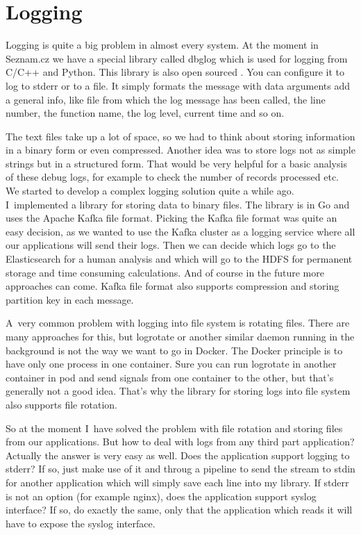 \chapter{Logging}

Logging is quite a big problem in almost every system. At the moment in Seznam.cz we have a special library called dbglog which is used for logging from C/C++ and Python. This library is also open sourced \cite{dbglog}. You can configure it to log to stderr or to a file. It simply formats the message with data arguments add a general info, like file from which the log message has been called, the line number, the function name, the log level, current time and so on.

The text files take up a lot of space, so we had to think about storing information in a binary form or even compressed. Another idea was to store logs not as simple strings but in a structured form. That would be very helpful for a basic analysis of these debug logs, for example to check the number of records processed etc. We started to develop a complex logging solution quite a while ago. I~implemented a library for storing data to binary files. The library is in Go and uses the Apache Kafka \cite{kafka} file format. Picking the Kafka file format was quite an easy decision, as we wanted to use the Kafka cluster as a logging service where all our applications will send their logs. Then we can decide which logs go to the Elasticsearch \cite{elasticsearch} for a human analysis and which will go to the HDFS \cite{hdfs} for permanent storage and time consuming calculations. And of course in the future more approaches can come. Kafka file format also supports compression and storing partition key in each message.

A~very common problem with logging into file system is rotating files. There are many approaches for this, but logrotate or another similar daemon running in the background is not the way we want to go in Docker. The Docker principle is to have only one process in one container. Sure you can run logrotate in another container in pod and send signals from one container to the other, but that’s generally not a good idea. That’s why the library for storing logs into file system also supports file rotation.

So at the moment I~have solved the problem with file rotation and storing files from our applications. But how to deal with logs from any third part application? Actually the answer is very easy as well. Does the application support logging to stderr? If so, just make use of it and throug a pipeline to send the stream to stdin for another application which will simply save each line into my library. If stderr is not an option (for example nginx), does the application support syslog interface? If so, do exactly the same, only that the application which reads it will have to expose the syslog interface.

